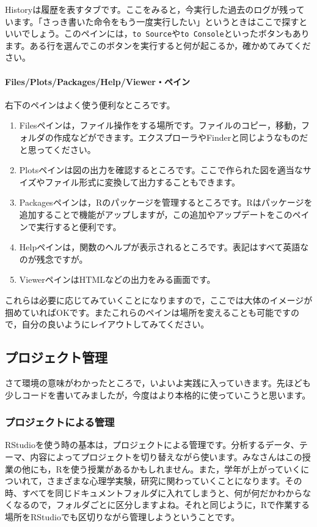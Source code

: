 \documentclass{ltjsbook}
\begin{document}
Historyは履歴を表すタブです。ここをみると，今実行した過去のログが残っています。「さっき書いた命令をもう一度実行したい」というときはここで探すといいでしょう。このペインには，\texttt{to Source}や\texttt{to Console}といったボタンもあります。ある行を選んでこのボタンを実行すると何が起こるか，確かめてみてください。
\paragraph{Files/Plots/Packages/Help/Viewer・ペイン}
右下のペインはよく使う便利なところです。
\begin{enumerate}
	\item Filesペインは，ファイル操作をする場所です。ファイルのコピー，移動，フォルダの作成などができます。エクスプローラやFinderと同じようなものだと思ってください。
	\item Plotsペインは図の出力を確認するところです。ここで作られた図を適当なサイズやファイル形式に変換して出力することもできます。
	\item Packagesペインは，Rのパッケージを管理するところです。Rはパッケージを追加することで機能がアップしますが，この追加やアップデートをこのペインで実行すると便利です。
	\item Helpペインは，関数のヘルプが表示されるところです。表記はすべて英語なのが残念ですが。
	\item ViewerペインはHTMLなどの出力をみる画面です。
\end{enumerate}
これらは必要に応じてみていくことになりますので，ここでは大体のイメージが掴めていればOKです。またこれらのペインは場所を変えることも可能ですので，自分の良いようにレイアウトしてみてください。

\subsection{プロジェクト管理}
さて環境の意味がわかったところで，いよいよ実践に入っていきます。先ほども少しコードを書いてみましたが，今度はより本格的に使っていこうと思います。
\subsubsection{プロジェクトによる管理}
\label{UnderProject}

RStudioを使う時の基本は，プロジェクトによる管理です。分析するデータ、テーマ、内容によってプロジェクトを切り替えながら使います。みなさんはこの授業の他にも，Rを使う授業があるかもしれません。また，学年が上がっていくについれて，さまざまな心理学実験，研究に関わっていくことになります。その時、すべてを同じドキュメントフォルダに入れてしまうと、何が何だかわからなくなるので，フォルダごとに区分しますよね。それと同じように，Rで作業する場所をRStudioでも区切りながら管理しようということです。
\end{document}
